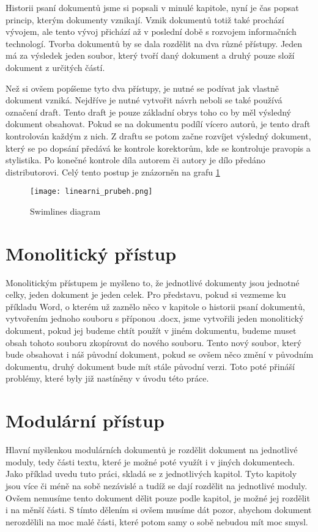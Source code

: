 Historii psaní dokumentů jsme si popsali v minulé kapitole, nyní je čas popsat princip, kterým dokumenty vznikají. Vznik dokumentů totiž také prochází
vývojem, ale tento vývoj přichází až v poslední době s rozvojem informačních technologí. Tvorba dokumentů by se dala rozdělit na dva různé přístupy.
Jeden má za výsledek jeden soubor, který tvoří daný dokument a druhý pouze složí dokument z určitých částí.

Než si ovšem popíšeme tyto dva přístupy, je nutné se podívat jak vlastně dokument vzniká. Nejdříve je nutné vytvořit návrh neboli se také používá
označení draft. Tento draft je pouze základní obrys toho co by měl výsledný dokument obsahovat. Pokud se na dokumentu podílí vícero autorů, je
tento draft kontrolován každým z nich. Z draftu se potom začne rozvíjet výsledný dokument, který se po dopsání předává ke kontrole korektorům,
kde se kontroluje pravopis a stylistika. Po konečné kontrole díla autorem či autory je dílo předáno distributorovi. Celý tento postup
je znázorněn na grafu \ref{fig:linflow}

\begin{figure}[h]
    \centering
    \texttt{[image: linearni\_prubeh.png]}
    \caption{Swimlines diagram}
    \label{fig:linflow}
\end{figure}

\section{Monolitický přístup}

Monolitickým přístupem je myšleno to, že jednotlivé dokumenty jsou jednotné celky, jeden dokument je jeden celek. Pro představu, pokud si vezmeme ku příkladu
Word, o kterém už zaznělo něco v kapitole o historii psaní dokumentů, vytvořením jednoho souboru s příponou .docx, jsme vytvořili jeden monolitický dokument, pokud jej
budeme chtít použít v jiném dokumentu, budeme muset obsah tohoto souboru zkopírovat do nového souboru. Tento nový soubor, který bude obsahovat i náš původní dokument,
pokud se ovšem něco změní v původním dokumentu, druhý dokument bude mít stále původní verzi. Toto poté přináší problémy, které byly již nastíněny v úvodu této práce.

\section{Modulární přístup}

Hlavní myšlenkou modulárních dokumentů je rozdělit dokument na jednotlivé moduly, tedy části textu, které je možné poté využít i v jiných dokumentech. Jako příklad uvedu
tuto práci, skladá se z jednotlivých kapitol. Tyto kapitoly jsou více či méně na sobě nezávislé a tudíž se dají rozdělit na jednotlivé moduly. Ovšem nemusíme tento
dokument dělit pouze podle kapitol, je možné jej rozdělit i na měnší části. S tímto dělením si ovšem musíme dát pozor, abychom dokument nerozdělili na moc malé části,
které potom samy o sobě nebudou mít moc smysl.

